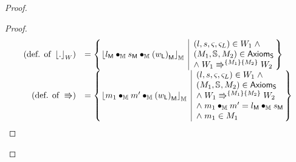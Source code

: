 \begin{lemma}
\begin{proof}
\begin{proof}
\[\begin{array}{r l}
	
	\left(\text{def. of } \reifyW{.}	\right)
	& =
	\left\{
	\hspace*{-0.15cm}
	\begin{array}{l | l}
		\reifyH{\heapPart{l} \composeH \heapPart{s} \composeH \heapPart{\left(\localPart{w}\right)}}
		&
		\hspace*{-0.15cm}
		\begin{array}{l}
			(l, s, \amod{}, \amod{L}) \in W_1 \;\land\\ 
			(\Hp{1}, \seq{}, \Hp{2}) \in \AxiomsSeq \\
			\land\;\repartitions{W_1}{W_2}{\Hp{1}}{\Hp{2}}
		\end{array}			
		\hspace*{-0.15cm}
	\end{array}
	\hspace*{-0.15cm}
	\right\}\\
	
	
	\left(\text{def. of } \Rrightarrow	\right)
	& =
	\left\{
	\hspace*{-0.15cm}
	\begin{array}{l | l}
		\reifyH{\h{1} \composeH \h{}' \composeH \heapPart{\left(\localPart{w}\right)}}
		&
		\hspace*{-0.15cm}
		\begin{array}{l}
			(l, s, \amod{}, \amod{L}) \in W_1 \;\land\\ 
			(\Hp{1}, \seq{}, \Hp{2}) \in \AxiomsSeq \\
			\land\;\repartitions{W_1}{W_2}{\Hp{1}}{\Hp{2}}\\
			\land\; \h{1} \composeH \h{}' = \heapPart{l} \composeH \heapPart{s}\\
			\land\; \h{1} \in \Hp{1}
		\end{array}			
		\hspace*{-0.15cm}
	\end{array}
	\hspace*{-0.15cm}
	\right\}\\
	

\end{array}\]
\end{proof}
\end{proof}
\end{lemma}
